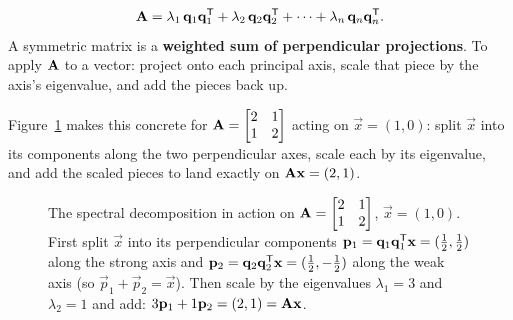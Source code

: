 \begin{focusbox}
\[
  \mathbf{A} = \lambda_1\,\mathbf{q}_1\mathbf{q}_1^{\mathsf{T}} + \lambda_2\,\mathbf{q}_2\mathbf{q}_2^{\mathsf{T}} + \cdots + \lambda_n\,\mathbf{q}_n\mathbf{q}_n^{\mathsf{T}}.
\]
A symmetric matrix is a \textbf{weighted sum of perpendicular projections}. To
apply $\mathbf{A}$ to a vector: project onto each principal axis, scale that piece by
the axis's eigenvalue, and add the pieces back up.
\end{focusbox}

Figure~\ref{ch26:fig-projsum} makes this concrete for
$\mathbf{A}=\begin{bmatrix}2&1\\1&2\end{bmatrix}$ acting on $\vec{x}=(1,0)$: split
$\vec{x}$ into its components along the two perpendicular axes, scale each by its
eigenvalue, and add the scaled pieces to land exactly on $\mathbf{A}\mathbf{x}=(2,1)$.

\begin{figure}[H]
\centering
{}
\caption{The spectral decomposition in action on
$\mathbf{A}=\protect\begin{bmatrix}2&1\\1&2\protect\end{bmatrix}$, $\vec{x}=(1,0)$.
First split $\vec{x}$ into its perpendicular components
$\mathbf{p}_1=\mathbf{q}_1\mathbf{q}_1^{\mathsf{T}}\mathbf{x}=(\tfrac12,\tfrac12)$ along the strong axis
and $\mathbf{p}_2=\mathbf{q}_2\mathbf{q}_2^{\mathsf{T}}\mathbf{x}=(\tfrac12,-\tfrac12)$ along the weak
axis (so $\vec{p}_1+\vec{p}_2=\vec{x}$). Then scale by the eigenvalues
$\lambda_1=3$ and $\lambda_2=1$ and add: $3\mathbf{p}_1+1\mathbf{p}_2=(2,1)=\mathbf{A}\mathbf{x}$.}
\label{ch26:fig-projsum}
\end{figure}

